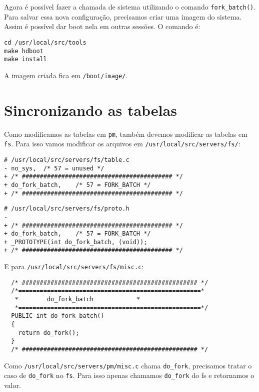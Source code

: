 \documentclass{amsart}
\theoremstyle{plain}
\newcommand{\code}[1]{\lstinline[mathescape=true]{#1}}
\begin{document}
Agora é possível fazer a chamada de sistema utilizando o comando \code{fork_batch()}. Para salvar
essa nova configuração, precisamos criar uma imagem do sistema. Assim é possível dar boot nela em
outras sessões. O comando é:

\begin{lstlisting}[frame=leftline,mathescape=true,style=nonumbers]
cd /usr/local/src/tools
make hdboot
make install
\end{lstlisting}

A imagem criada fica em \code{/boot/image/}.

\section{Sincronizando as tabelas}

Como modificamos as tabelas em \code{pm}, também devemos modificar as tabelas em \code{fs}. Para
isso vamos modificar os arquivos em \code{/usr/local/src/servers/fs/}:

\begin{lstlisting}[frame=leftline,mathescape=true,style=nonumbers]
# /usr/local/src/servers/fs/table.c
- no_sys,  /* 57 = unused */
+ /* ########################################## */
+ do_fork_batch,    /* 57 = FORK_BATCH */
+ /* ########################################## */
\end{lstlisting}

\begin{lstlisting}[frame=leftline,mathescape=true,style=nonumbers]
# /usr/local/src/servers/fs/proto.h
-
+ /* ########################################## */
+ do_fork_batch,    /* 57 = FORK_BATCH */
+ _PROTOTYPE(int do_fork_batch, (void));
+ /* ########################################## */
\end{lstlisting}

E para \code{/usr/local/src/servers/fs/misc.c}:

\begin{verbatim}
  /* ################################################# */
  /*===================================================*
   *        do_fork_batch            *
   *===================================================*/
  PUBLIC int do_fork_batch()
  {
    return do_fork();
  }
  /* ################################################# */
\end{verbatim}

Como \code{/usr/local/src/servers/pm/misc.c} chama \code{do_fork}, precisamos tratar o caso de
\code{do_fork} no \code{fs}. Para isso apenas chamamos \code{do_fork} do fs e retornamos o valor.
\end{document}
